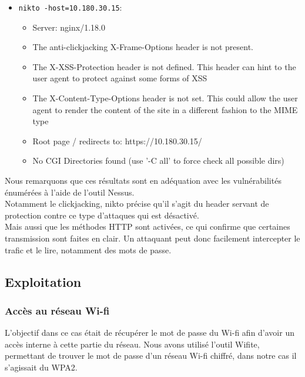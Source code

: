 \documentclass[french,paper=a4,oneside,captions=tableheading]{article}
\begin{document}
\begin{itemize}
\begin{itemize}
    \end{itemize}
    \item \texttt{nikto -host=10.180.30.15}:
    \begin{itemize}
        \item Server: nginx/1.18.0
        \item The anti-clickjacking X-Frame-Options header is not present.
        \item The X-XSS-Protection header is not defined. This header can hint to the user agent to protect against some forms of XSS
        \item The X-Content-Type-Options header is not set. This could allow the user agent to render the content of the site in a different fashion to the MIME type
        \item Root page / redirects to: https://10.180.30.15/
        \item No CGI Directories found (use '-C all' to force check all possible dirs)\\
    \end{itemize}
\end{itemize}
Nous remarquons que ces résultats sont en adéquation avec les vulnérabilités énumérées à l'aide de l'outil Nessus.\\
Notamment le clickjacking, nikto précise qu'il s'agit du header servant de protection contre ce type d'attaques qui est désactivé.\\
Mais aussi que les méthodes HTTP sont activées, ce qui confirme que certaines transmission sont faites en clair. Un attaquant peut donc facilement intercepter le trafic et le lire, notamment des mots de passe.










\subsection{Exploitation}



\subsubsection{Accès au réseau Wi-fi}

L'objectif dans ce cas était de récupérer le mot de passe du Wi-fi afin d'avoir un accès interne à cette partie du réseau.
Nous avons utilisé l'outil Wifite, permettant de trouver le mot de passe d'un réseau Wi-fi chiffré, dans notre cas il s'agissait du WPA2.\\
\end{document}
